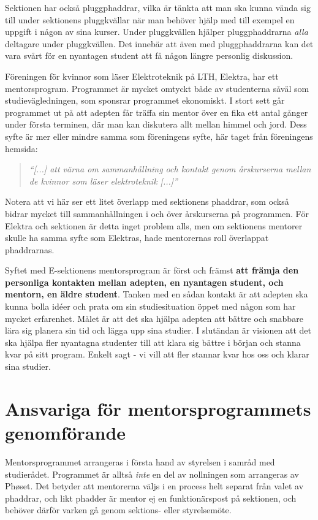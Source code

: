 \documentclass[10pt]{article}
\begin{document}
    Sektionen har också pluggphaddrar, vilka är tänkta att man ska kunna vända sig till under sektionens pluggkvällar när man behöver hjälp med till exempel en uppgift i någon av sina kurser.
    Under pluggkvällen hjälper pluggphaddrarna \emph{alla} deltagare under pluggkvällen.
    Det innebär att även med pluggphaddrarna kan det vara svårt för en nyantagen student att få någon längre personlig diskussion.

    Föreningen för kvinnor som läser Elektroteknik på LTH, Elektra, har ett mentorsprogram.
    Programmet är mycket omtyckt både av studenterna såväl som studievägledningen, som sponsrar programmet ekonomiskt.
    I stort sett går programmet ut på att adepten får träffa sin mentor över en fika ett antal gånger under första terminen, där man kan diskutera allt mellan himmel och jord.
    Dess syfte är mer eller mindre samma som föreningens syfte, här taget från föreningens hemsida:
    \begin{quote}
    \emph{``[...] att värna om sammanhållning och kontakt genom årskurserna mellan de kvinnor som läser elektroteknik [...]''}
    \end{quote}
    Notera att vi här ser ett litet överlapp med sektionens phaddrar, som också bidrar mycket till sammanhållningen i och över årskurserna på programmen.
    För Elektra och sektionen är detta inget problem alls, men om sektionens mentorer skulle ha samma syfte som Elektras, hade mentorernas roll överlappat phaddrarnas.

    Syftet med E-sektionens mentorsprogram är först och främst \textbf{att främja den personliga kontakten mellan adepten, en nyantagen student, och mentorn, en äldre student}.
    Tanken med en sådan kontakt är att adepten ska kunna bolla idéer och prata om sin studiesituation öppet med någon som har mycket erfarenhet.
    Målet är att det ska hjälpa adepten att bättre och snabbare lära sig planera sin tid och lägga upp sina studier.
    I slutändan är visionen att det ska hjälpa fler nyantagna studenter till att klara sig bättre i början och stanna kvar på sitt program.
    Enkelt sagt - vi vill att fler stannar kvar hos oss och klarar sina studier.

    \newpage

    \section{Ansvariga för mentorsprogrammets genomförande}
    Mentorsprogrammet arrangeras i första hand av styrelsen i samråd med studierådet.
    Programmet är alltså \emph{inte} en del av nollningen som arrangeras av Ph\o set.
    Det betyder att mentorerna väljs i en process helt separat från valet av phaddrar, och likt phadder är mentor ej en funktionärspost på sektionen, och behöver därför varken gå genom sektions- eller styrelsemöte.
\end{document}
